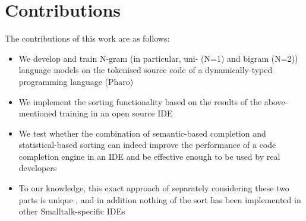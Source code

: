 \section{Contributions}
The contributions of this work are as follows:
\begin{itemize}
    \item We develop and train N-gram (in particular, uni- (N=1) and bigram (N=2)) language models on the tokenised source code of a dynamically-typed programming language (Pharo)
    \item We implement the sorting functionality based on the results of the above-mentioned training in an open source IDE
    \item We test whether the combination of semantic-based completion and statistical-based sorting can indeed improve the performance of a code completion engine in an IDE and be effective enough to be used by real developers
    \item To our knowledge, this exact approach of separately considering these two parts is unique , and in addition nothing of the sort has been implemented in other Smalltalk-specific IDEs
\end{itemize}


